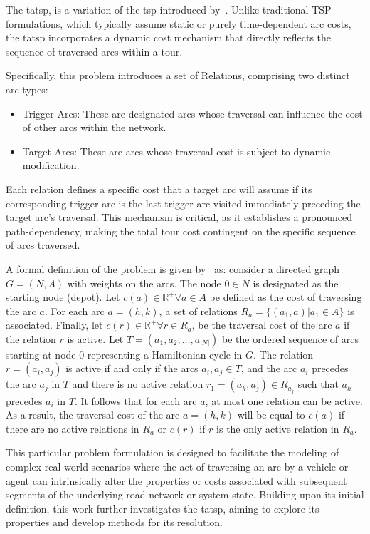 \documentclass[twocolumn, switch]{article} %
\begin{document}
The \gls{tatsp}, is a variation of the \gls{tsp} introduced by~\cite{Cerrone}. 
Unlike traditional TSP formulations, which typically assume static or purely time-dependent arc costs, 
the \gls{tatsp} incorporates a dynamic cost mechanism that directly reflects the sequence of traversed arcs within a tour.

Specifically, this problem introduces a set of Relations, comprising two distinct arc types:
\begin{itemize}
\item Trigger Arcs: These are designated arcs whose traversal can influence the cost of other arcs within the network.
\item Target Arcs: These are arcs whose traversal cost is subject to dynamic modification.
\end{itemize}
Each relation defines a specific cost that a target arc will assume if its corresponding trigger arc is the last trigger 
arc visited immediately preceding the target arc's traversal. This mechanism is critical, as it establishes a pronounced 
path-dependency, making the total tour cost contingent on the specific sequence of arcs traversed.

A formal definition of the problem is given by~\cite{Cerrone} as:
consider a directed graph $G = (N,A)$ with weights on the arcs. 
The node $0 \in N$ is designated as the starting node (depot). Let $c(a) \in \mathbb{R}^+ \forall a \in A$ 
be defined as the cost of traversing the arc $a$. For each arc $a=(h, k)$, a set of relations $R_a = \{(a_1, a)| a_1 \in A\}$ 
is associated. Finally, let $c(r) \in \mathbb{R}^+ \forall r \in R_a$, be the traversal cost of the arc $a$ if the relation $r$ 
is active. Let $T = (a_1, a_2, \ldots, a_{|N|})$ be the ordered sequence of arcs starting at node $0$ representing a Hamiltonian 
cycle in $G$. The relation $r = (a_i, a_j)$ is active if and only if the arcs $a_i, a_j \in T$, and the arc $a_i$ precedes the arc 
$a_j$ in $T$ and there is no active relation $r_1 = (a_k, a_j) \in R_{a_j}$ such that $a_k$ precedes $a_i$ in $T$. It follows that 
for each arc $a$, at most one relation can be active. As a result, the traversal cost of the arc $a = (h, k)$ will be equal to $c(a)$ 
if there are no active relations in $R_a$ or $c(r)$ if $r$ is the only active relation in $R_a$.

This particular problem formulation is designed to facilitate the modeling of complex real-world scenarios where the act of 
traversing an arc by a vehicle or agent can intrinsically alter the properties or costs associated with subsequent segments of 
the underlying road network or system state. Building upon its initial definition, this work further investigates the \gls{tatsp}, 
aiming to explore its properties and develop methods for its resolution.
\end{document}
